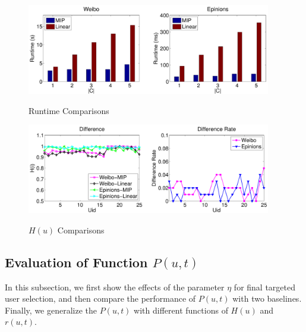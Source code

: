 \documentclass{llncs}
\begin{document}
\begin{figure}[htb]
\begin{minipage}[t]{0.5\linewidth}
   \centering
   \includegraphics[width=0.95\textwidth]{res/isu_b_runtime.pdf}\\
   \vspace*{-0.4cm}
   \caption{Runtime Comparisons}\label{fig:runtime}
\end{minipage}%
\begin{minipage}[t]{0.5\linewidth}
   \centering
   \includegraphics[width=0.95\textwidth]{res/isu_b_entropyRate.pdf}\\
   \vspace*{-0.4cm}
   \caption{$H(u)$ Comparisons}\label{fig:hesitantEntropy}
\end{minipage}
\end{figure}

\vspace*{-0.6cm}
\subsection{Evaluation of Function $P(u,t)$}
\vspace*{-0.3cm}
In this subsection, we first show the effects of the parameter $\eta$ for final targeted user selection, and then compare the performance of $P(u,t)$ with two baselines. Finally, we generalize the $P(u,t)$ with different functions of $H(u)$ and $r(u,t)$. 
\end{document}
